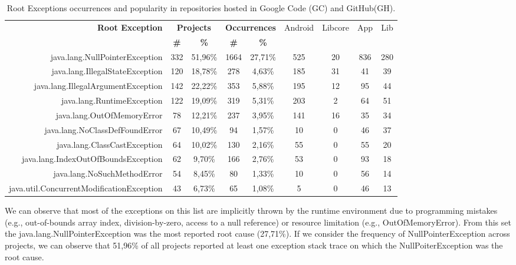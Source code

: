 \documentclass[conference]{IEEEtran}
\begin{document}
\begin{table}
  \centering
  \begin{tabular}{rcccccccc}
    \hline
    \bfseries{Root Exception} &  \multicolumn{2}{c}{\bfseries{Projects}} &  \multicolumn{2}{c}{\bfseries{Occurrences}} & \textsf{Android} & \textsf{Libcore} & \textsf{App} & \textsf{Lib} \\
    & \bfseries{\#} &  \bfseries{\%} & \bfseries{\# } & \bfseries{\% } &&&&\\
    \hline

java.lang.NullPointerException	&	332	&	51,96\%	&	1664	&	27,71\%	&	525	&	20	&	836	&	280	\\
java.lang.IllegalStateException	&	120	&	18,78\%	&	278	&	4,63\%	&	185	&	31	&	41	&	39	\\
java.lang.IllegalArgumentException	&	142	&	22,22\%	&	353	&	5,88\%	&	195	&	12	&	95	&	44	\\
java.lang.RuntimeException	&	122	&	19,09\%	&	319	&	5,31\%	&	203	&	2	&	64	&	51	\\
java.lang.OutOfMemoryError	&	78	&	12,21\%	&	237	&	3,95\%	&	141	&	16	&	35	&	34	\\
java.lang.NoClassDefFoundError	&	67	&	10,49\%	&	94	&	1,57\%	&	10	&	0	&	46	&	37	\\
java.lang.ClassCastException	&	64	&	10,02\%	&	130	&	2,16\%	&	55	&	0	&	55	&	20	\\
java.lang.IndexOutOfBoundsException	&	62	&	9,70\%	&	166	&	2,76\%	&	53	&	0	&	93	&	18	\\
java.lang.NoSuchMethodError	&	54	&	8,45\%	&	80	&	1,33\%	&	10	&	0	&	56	&	14	\\
java.util.ConcurrentModificationException	&	43	&	6,73\%	&	65	&	1,08\%	&	5	&	0	&	46	&	13	\\
    \hline
  \end{tabular}
\caption{Root Exceptions occurrences and popularity in repositories hosted in Google Code (GC) and GitHub(GH).}
\label{tab:topten}
\end{table}

 
We can observe that most of the exceptions on this list are implicitly thrown by the
 runtime environment due to programming mistakes  (e.g., out-of-bounds array index, division-by-zero, access to a null reference)
 or resource limitation (e.g., OutOfMemoryError). 
From this set the java.lang.NullPointerException was the most reported root cause (27,71\%). 
If we consider the frequency of NullPointerException 
across projects, we can observe that 51,96\% of all projects reported at least one exception stack 
trace on which the NullPoiterException was the root cause.
\end{document}
